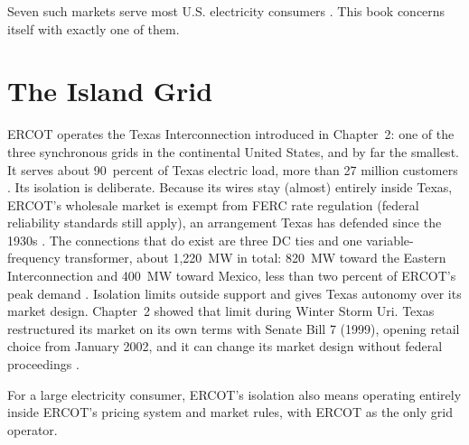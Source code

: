 Seven such markets serve most U.S. electricity consumers \autocite{isorto2026home}. %
This book concerns itself with exactly one of them.

\section{The Island Grid}

ERCOT operates the Texas Interconnection introduced in Chapter~2: one of the three synchronous grids in the continental United States, and by far the smallest. It serves about 90~percent of Texas electric load, more than 27 million customers \autocite{ercot2026factsheet}. %
Its isolation is deliberate. Because its wires stay (almost) entirely inside Texas, ERCOT's wholesale market is exempt from FERC rate regulation (federal reliability standards still apply), an arrangement Texas has defended since the 1930s \autocite{ercot2025gridinsightsabout}. %
The connections that do exist are three DC ties and one variable-frequency transformer, about 1,220~MW in total: 820~MW toward the Eastern Interconnection and 400~MW toward Mexico, less than two percent of ERCOT's peak demand \autocite{ercot2025gridinsightsdcties}. %
Isolation limits outside support and gives Texas autonomy over its market design. Chapter~2 showed that limit during Winter Storm Uri. Texas restructured its market on its own terms with Senate Bill 7 (1999), opening retail choice from January 2002, and it can change its market design without federal proceedings \autocite{texas1999sb7}. %

For a large electricity consumer, ERCOT's isolation also means operating entirely inside ERCOT's pricing system and market rules, with ERCOT as the only grid operator.


